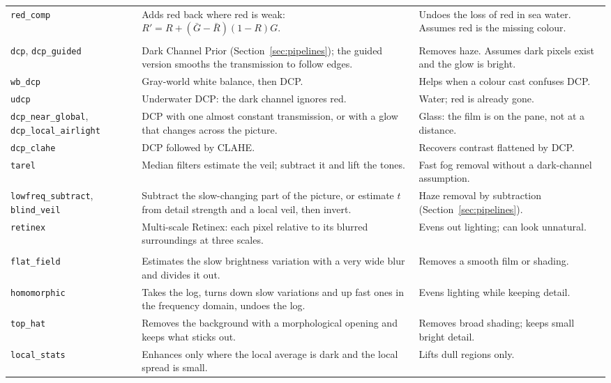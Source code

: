 \documentclass[10pt,a4paper]{article}
\begin{document}
{\begin{longtable}{p{2.7cm}p{6.5cm}p{6.4cm}}
\texttt{red\_comp} & Adds red back where red is weak: $R'=R+(\bar G-\bar R)(1-R)G$. & Undoes the loss of red in sea water. Assumes red is the missing colour.\\
\addlinespace\multicolumn{3}{l}{\textbf{Haze and veil removal}}\\
\texttt{dcp}, \texttt{dcp\_guided} & Dark Channel Prior (Section~\ref{sec:pipelines}); the guided version smooths the transmission to follow edges. & Removes haze. Assumes dark pixels exist and the glow is bright.\\
\texttt{wb\_dcp} & Gray-world white balance, then DCP. & Helps when a colour cast confuses DCP.\\
\texttt{udcp} & Underwater DCP: the dark channel ignores red. & Water; red is already gone.\\
\texttt{dcp\_near\_global}, \texttt{dcp\_local\_airlight} & DCP with one almost constant transmission, or with a glow that changes across the picture. & Glass: the film is on the pane, not at a distance.\\
\texttt{dcp\_clahe} & DCP followed by CLAHE. & Recovers contrast flattened by DCP.\\
\texttt{tarel} & Median filters estimate the veil; subtract it and lift the tones. & Fast fog removal without a dark-channel assumption.\\
\texttt{lowfreq\_subtract}, \texttt{blind\_veil} & Subtract the slow-changing part of the picture, or estimate $t$ from detail strength and a local veil, then invert. & Haze removal by subtraction (Section~\ref{sec:pipelines}).\\
\texttt{retinex} & Multi-scale Retinex: each pixel relative to its blurred surroundings at three scales. & Evens out lighting; can look unnatural.\\
\addlinespace\multicolumn{3}{l}{\textbf{Uneven lighting or film}}\\
\texttt{flat\_field} & Estimates the slow brightness variation with a very wide blur and divides it out. & Removes a smooth film or shading.\\
\texttt{homomorphic} & Takes the log, turns down slow variations and up fast ones in the frequency domain, undoes the log. & Evens lighting while keeping detail.\\
\texttt{top\_hat} & Removes the background with a morphological opening and keeps what sticks out. & Removes broad shading; keeps small bright detail.\\
\texttt{local\_stats} & Enhances only where the local average is dark and the local spread is small. & Lifts dull regions only.\\

\end{longtable}}
\end{document}
